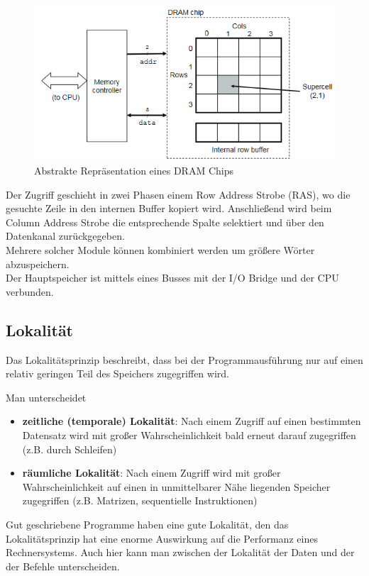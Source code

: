 \documentclass[a4paper,12pt,leqno]{article}
\begin{document}
\begin{figure}[h!]
\centering
\includegraphics[scale=0.5]{Grafiken/AbstrakterDRAM.png}
\caption{Abstrakte Repräsentation eines DRAM Chips}
\end{figure}

Der Zugriff geschieht in zwei Phasen einem Row Address Strobe (RAS), wo die gesuchte Zeile in den internen Buffer kopiert wird. Anschließend wird beim Column Address Strobe die entsprechende Spalte selektiert und über den Datenkanal zurückgegeben.\\
Mehrere solcher Module können kombiniert werden um größere Wörter abzuspeichern.\\
Der Hauptspeicher ist mittels eines Busses mit der I/O Bridge und der CPU verbunden.

\subsection{Lokalität}
Das Lokalitätsprinzip beschreibt, dass bei der Programmausführung nur auf einen relativ geringen Teil des Speichers zugegriffen wird.

Man unterscheidet
\begin{itemize}
\item \textbf{zeitliche (temporale) Lokalität}: Nach einem Zugriff auf einen bestimmten Datensatz wird mit großer Wahrscheinlichkeit bald erneut darauf zugegriffen (z.B. durch Schleifen)
\item \textbf{räumliche Lokalität}: Nach einem Zugriff wird mit großer Wahrscheinlichkeit auf einen in unmittelbarer Nähe liegenden Speicher zugegriffen (z.B. Matrizen, sequentielle Instruktionen)
\end{itemize} 

Gut geschriebene Programme haben eine gute Lokalität, den das Lokalitätsprinzip hat eine enorme Auswirkung auf die Performanz eines Rechnersystems. Auch hier kann man zwischen der Lokalität der Daten und der der Befehle unterscheiden.
\end{document}
